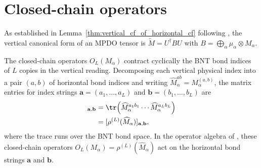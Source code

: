 \section{Closed-chain operators}

As established in Lemma~\ref{thm:vertical_cf_of_horizontal_cf} following
\cite[Section~4]{Cirac2016MPDO_arXiv}, the vertical canonical form of an MPDO
tensor is $\widetilde M = U^\dagger B U$ with
$B=\bigoplus_\alpha\mu_\alpha\otimes M_\alpha$.

The closed-chain operators $O_L(M_\alpha)$ contract cyclically the BNT bond
indices of $L$ copies in the vertical reading. Decomposing each vertical
physical index into a pair $(a,b)$ of horizontal bond indices and writing
$\widehat M_\alpha^{ab}=M_\alpha^{(a,b)}$, the matrix entries for index strings
$\mathbf a=(a_1,\ldots,a_L)$ and $\mathbf b=(b_1,\ldots,b_L)$ are
\begin{align}
    [O_L(M_\alpha)]_{\mathbf a,\mathbf b}
     & = \tr\!\left(\widehat M_\alpha^{a_1b_1}\cdots
    \widehat M_\alpha^{a_Lb_L}\right) \notag                    \\
     & = [\rho^{(L)}(\widehat M_\alpha)]_{\mathbf a,\mathbf b},
    \notag
\end{align}
where the trace runs over the BNT bond space. In the operator algebra of
\cite[Theorem~4.14]{Cirac2016MPDO_arXiv}, these closed-chain operators
$O_L(M_\alpha)=\rho^{(L)}(\widehat M_\alpha)$ act on the horizontal bond
strings $\mathbf a$ and $\mathbf b$.


